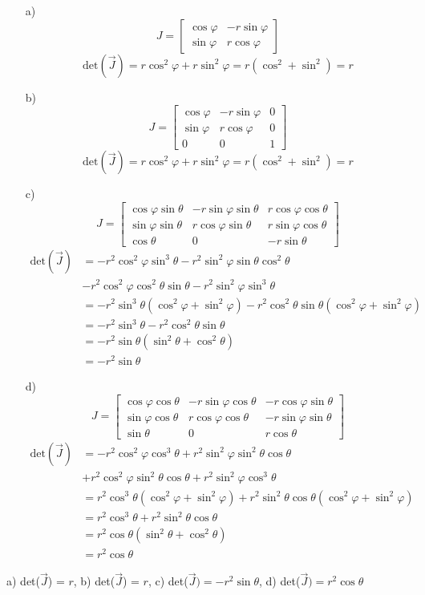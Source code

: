 {\begin{itemize}
\item[a)] \[
J =
\begin{bmatrix}
\cos\varphi & -r \sin\varphi \\
\sin\varphi& r \cos\varphi
\end{bmatrix}
\]
$$
\text{det}(\vec J) = r \cos^2 \varphi + r \sin^2 \varphi = r(\cos^2+\sin^2) = r 
$$
\item[b)] \[J =
\begin{bmatrix}
\cos\varphi & -r \sin\varphi & 0 \\
\sin\varphi& r \cos\varphi & 0 \\
0 & 0 & 1
\end{bmatrix}
\]
$$
\text{det}(\vec J) = r \cos^2 \varphi + r \sin^2 \varphi = r(\cos^2+\sin^2) = r 
$$
\item[c)] \[J =
\begin{bmatrix}
\cos\varphi \sin \theta & -r \sin\varphi \sin \theta & r \cos \varphi \cos \theta \\
\sin\varphi \sin \theta & r \cos\varphi \sin \theta & r \sin \varphi \cos \theta \\
\cos \theta & 0 & -r \sin \theta 
\end{bmatrix}
\]
\begin{align*}
\text{det}(\vec J) &= -r^2 \cos^2 \varphi \sin^3 \theta - r^2 \sin^2 \varphi \sin \theta \cos^2 \theta \\
&- r^2 \cos^2 \varphi \cos^2 \theta \sin \theta -r^2 \sin^2 \varphi \sin^3 \theta \\
&= -r^2 \sin^3 \theta (\cos^2 \varphi + \sin^2 \varphi) -r^2 \cos^2 \theta \sin \theta (\cos^2 \varphi + \sin^2 \varphi) \\
&= -r^2 \sin^3 \theta - r^2 \cos^2 \theta \sin \theta \\
&= -r^2 \sin \theta (\sin^2 \theta + \cos^2 \theta) \\
&= -r^2 \sin \theta
\end{align*}
\item[d)] \[J =
\begin{bmatrix}
\cos\varphi \cos \theta & -r \sin\varphi \cos \theta & -r \cos \varphi \sin \theta \\
\sin\varphi \cos \theta & r \cos\varphi \cos \theta & -r \sin \varphi \sin \theta \\
\sin \theta & 0 & r \cos \theta 
\end{bmatrix}
\]
\begin{align*}
\text{det}(\vec J) &= -r^2 \cos^2 \varphi \cos^3 \theta + r^2 \sin^2 \varphi \sin^2 \theta \cos \theta \\
&+ r^2 \cos^2 \varphi \sin^2 \theta \cos \theta + r^2 \sin^2 \varphi \cos^3 \theta \\
&= r^2 \cos^3 \theta (\cos^2 \varphi + \sin^2 \varphi) + r^2 \sin^2 \theta \cos \theta (\cos^2 \varphi + \sin^2 \varphi) \\
&= r^2 \cos^3 \theta + r^2 \sin^2 \theta \cos \theta \\
&= r^2 \cos \theta (\sin^2 \theta + \cos^2 \theta) \\
&= r^2 \cos \theta
\end{align*}
\end{itemize}
}

{
a) det($\vec J$) = $r$,
b) det($\vec J$) = $r$,  
c) det($\vec J) = -r^2 \sin \theta$, 
d) det($\vec J) = r^2 \cos \theta$                                                            
}                                    
